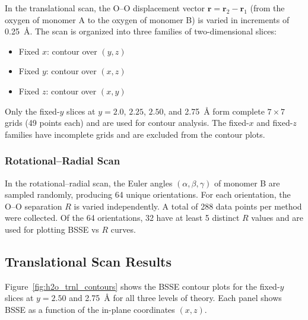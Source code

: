 In the translational scan, the O--O displacement vector
$\mathbf{r} = \mathbf{r}_2 - \mathbf{r}_1$ (from the oxygen of
monomer A to the oxygen of monomer B) is varied in increments of
\SI{0.25}{\angstrom}. The scan is organized into three families of
two-dimensional slices:
\begin{itemize}
    \item Fixed $x$: contour over $(y, z)$
    \item Fixed $y$: contour over $(x, z)$
    \item Fixed $z$: contour over $(x, y)$
\end{itemize}
Only the fixed-$y$ slices at $y = 2.0$, $2.25$, $2.50$, and
\SI{2.75}{\angstrom} form complete $7 \times 7$ grids (49 points each)
and are used for contour analysis. The fixed-$x$ and fixed-$z$
families have incomplete grids and are excluded from the contour plots.

\subsubsection{Rotational--Radial Scan}

In the rotational--radial scan, the Euler angles $(\alpha, \beta,
\gamma)$ of monomer B are sampled randomly, producing 64 unique
orientations. For each orientation, the O--O separation $R$ is varied
independently. A total of 288 data points per method were collected.
Of the 64 orientations, 32 have at least 5 distinct $R$ values and
are used for plotting BSSE vs $R$ curves.

\subsection{Translational Scan Results}

Figure~\ref{fig:h2o_trnl_contours} shows the BSSE contour plots for
the fixed-$y$ slices at $y = 2.50$ and \SI{2.75}{\angstrom} for all
three levels of theory. Each panel shows BSSE as a function of the
in-plane coordinates $(x, z)$.

